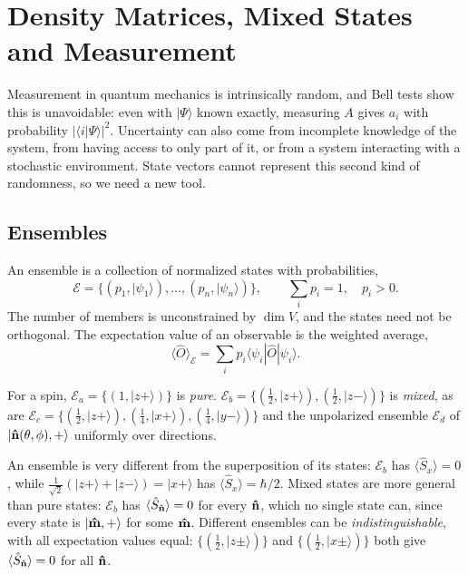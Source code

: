 \chapter{Density Matrices, Mixed States and Measurement}
\label{ch:density}

Measurement in quantum mechanics is intrinsically random, and Bell tests show this is unavoidable: even with $|\Psi\rangle$ known exactly, measuring $A$ gives $a_i$ with probability $|\langle i|\Psi\rangle|^2$. Uncertainty can also come from incomplete knowledge of the system, from having access to only part of it, or from a system interacting with a stochastic environment. State vectors cannot represent this second kind of randomness, so we need a new tool.

\section{Ensembles}

\begin{definition}[Ensemble]
An ensemble is a collection of normalized states with probabilities,
\[
    \mathcal{E} = \bigl\{(p_1,|\psi_1\rangle),\ldots,(p_n,|\psi_n\rangle)\bigr\},
    \qquad
    \sum_ip_i = 1,
    \quad
    p_i>0 .
\]
The number of members is unconstrained by $\dim V$, and the states need not be orthogonal. The expectation value of an observable is the weighted average,
\[
    \langle\hat{O}\rangle_{\mathcal{E}} = \sum_ip_i\langle\psi_i|\hat{O}|\psi_i\rangle .
\]
\end{definition}

\begin{example}
For a spin, $\mathcal{E}_a = \{(1,|z+\rangle)\}$ is \emph{pure}. $\mathcal{E}_b = \{(\frac12,|z+\rangle),(\frac12,|z-\rangle)\}$ is \emph{mixed}, as are $\mathcal{E}_c = \{(\frac12,|z+\rangle),(\frac14,|x+\rangle),(\frac14,|y-\rangle)\}$ and the unpolarized ensemble $\mathcal{E}_d$ of $|\boldsymbol{\hat{\textbf{n}}}(\theta,\phi),+\rangle$ uniformly over directions.
\end{example}

An ensemble is very different from the superposition of its states: $\mathcal{E}_b$ has $\langle\hat{S}_x\rangle = 0$, while $\frac{1}{\sqrt2}(|z+\rangle + |z-\rangle) = |x+\rangle$ has $\langle\hat{S}_x\rangle = \hbar/2$. Mixed states are more general than pure states: $\mathcal{E}_b$ has $\langle\hat{S}_{\boldsymbol{\hat{\textbf{n}}}}\rangle = 0$ for every $\boldsymbol{\hat{\textbf{n}}}$, which no single state can, since every state is $|\boldsymbol{\hat{\textbf{m}}},+\rangle$ for some $\boldsymbol{\hat{\textbf{m}}}$. Different ensembles can be \emph{indistinguishable}, with all expectation values equal: $\{(\frac12,|z\pm\rangle)\}$ and $\{(\frac12,|x\pm\rangle)\}$ both give $\langle\hat{S}_{\boldsymbol{\hat{\textbf{n}}}}\rangle = 0$ for all $\boldsymbol{\hat{\textbf{n}}}$.


